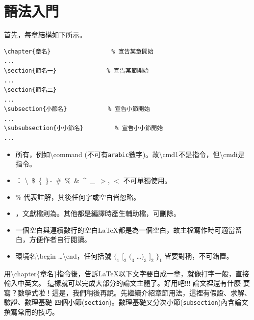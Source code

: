 \chapter{\protect 語法入門}
首先，每章結構如下所示。

\begin{Verbatim}[frame=single,firstline=1,label=Every chapter]
\chapter{章名}   　　　　　　　　 % 宣告某章開始
...
\section{節名一}　　　　　　　　 % 宣告某節開始
...
\section{節名二}
...
\subsection{小節名}　　　　　　　% 宣告小節開始
...
\subsubsection{小小節名}         % 宣告小小節開始
...
\end{Verbatim}
\begin{itemize}
\item 所有，例如\textbackslash command (不可有{\tt arabic}數字)。故\textbackslash cmd1不是指令，但\textbackslash cmdi是指令。 
\item {}： \textbackslash\  \$\ \{\ \}\ $\tilde{}$\ \#\ \%\ \&\ \textasciicircum\
 \_\ $>$, $<$ 不可單獨使用。  
\item \% 代表註解，其後任何字或空白皆忽略。
\item {}，文獻檔則為。其他都是編譯時產生輔助檔，可刪除。
\item 一個空白與連續數行的空白\LaTeX{}都是為一個空白，故主檔寫作時可適當留白，方便作者自行閱讀。
\item 環境名\textbackslash begin \ldots \textbackslash end，任何括號 $\{_1$ $[_2$ $(_{3}$ \ldots $)_3$ $]_2$ $\}_1$ 皆要對稱，不可錯置。
\end{itemize}
用{\textbackslash chapter\{章名\}}指令後，告訴\LaTeX{}以下文字要自成一章，就像打字一般，直接輸入中英文。
這樣就可以完成大部分的論文主體了。好用吧!!! 論文裡還有什麼
要寫？數學式啦！這是，我們稍後再說。先繼續介紹章節用法，這裡有假設、求解、驗證、數理基礎 四個小節({\tt section})。數理基礎又分次小節({\tt subsection})內含論文撰寫常用的技巧。

